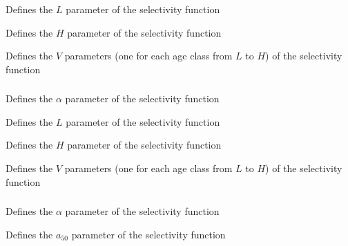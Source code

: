 \subsubsection[All-values-bounded]{}

 {Defines the $L$ parameter of the selectivity function}

 {Defines the $H$ parameter of the selectivity function}

 {Defines the $V$ parameters (one for each age class from $L$ to $H$) of the selectivity function}

\subsubsection[Increasing]{}

 {Defines the $\alpha$ parameter of the selectivity function}

 {Defines the $L$ parameter of the selectivity function}

 {Defines the $H$ parameter of the selectivity function}

 {Defines the $V$ parameters (one for each age class from $L$ to $H$) of the selectivity function}

\subsubsection[Logistic]{}

 {Defines the $\alpha$ parameter of the selectivity function}

 {Defines the $a_{50}$ parameter of the selectivity function}

